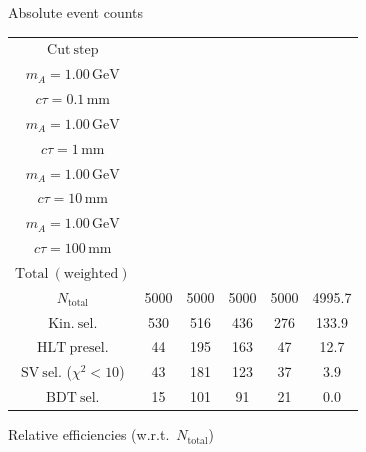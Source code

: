 \documentclass[10pt,a4paper]{article}
\renewcommand{\arraystretch}{1.4}
\begin{document}
{\footnotesize\setlength{\tabcolsep}{4pt}\renewcommand{\arraystretch}{1.05}%
\vspace{12pt}

Absolute event counts

\begin{tabular}{cccccc}
\toprule
$\mathrm{Cut\ step}$ & \shortstack{$m_{\pi}=10\,\mathrm{GeV}$\\$m_{A}=1.00\,\mathrm{GeV}$\\$c\tau=0.1\,\mathrm{mm}$} & \shortstack{$m_{\pi}=10\,\mathrm{GeV}$\\$m_{A}=1.00\,\mathrm{GeV}$\\$c\tau=1\,\mathrm{mm}$} & \shortstack{$m_{\pi}=10\,\mathrm{GeV}$\\$m_{A}=1.00\,\mathrm{GeV}$\\$c\tau=10\,\mathrm{mm}$} & \shortstack{$m_{\pi}=10\,\mathrm{GeV}$\\$m_{A}=1.00\,\mathrm{GeV}$\\$c\tau=100\,\mathrm{mm}$} & \shortstack{$\mathrm{QCD}$\\$\mathrm{Total\ (weighted)}$} \\
\midrule
$N_{\mathrm{total}}$ & 5000 & 5000 & 5000 & 5000 & 4995.7\\
$\mathrm{Kin.\ sel.}$ & 530 & 516 & 436 & 276 & 133.9\\
$\mathrm{HLT\ presel.}$ & 44 & 195 & 163 & 47 & 12.7\\
$\mathrm{SV\ sel.}$ ($\chi^2{<}10$) & 43 & 181 & 123 & 37 & 3.9\\
$\mathrm{BDT\ sel.}$ & 15 & 101 & 91 & 21 & 0.0\\
\bottomrule
\end{tabular}

\vspace{18pt}

Relative efficiencies (w.r.t.\ $N_{\mathrm{total}}$)

}
\end{document}
